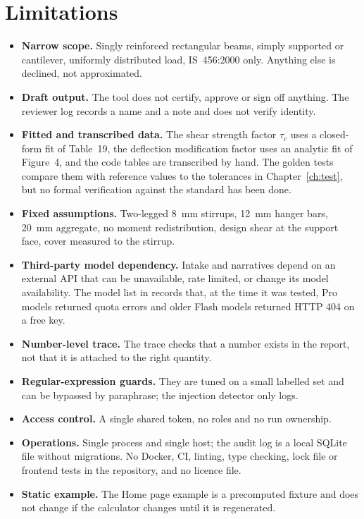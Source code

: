 \chapter{Limitations}\label{ch:limits}

\begin{itemize}
  \item \textbf{Narrow scope.} Singly reinforced rectangular beams, simply supported or cantilever, uniformly distributed load, IS~456:2000 only. Anything else is declined, not approximated.
  \item \textbf{Draft output.} The tool does not certify, approve or sign off anything. The reviewer log records a name and a note and does not verify identity.
  \item \textbf{Fitted and transcribed data.} The shear strength factor $\tau_c$ uses a closed-form fit of Table~19, the deflection modification factor uses an analytic fit of Figure~4, and the code tables are transcribed by hand. The golden tests compare them with reference values to the tolerances in Chapter~\ref{ch:test}, but no formal verification against the standard has been done.
  \item \textbf{Fixed assumptions.} Two-legged 8~mm stirrups, 12~mm hanger bars, 20~mm aggregate, no moment redistribution, design shear at the support face, cover measured to the stirrup.
  \item \textbf{Third-party model dependency.} Intake and narratives depend on an external API that can be unavailable, rate limited, or change its model availability. The model list in  records that, at the time it was tested, Pro models returned quota errors and older Flash models returned HTTP 404 on a free key.
  \item \textbf{Number-level trace.} The trace checks that a number exists in the report, not that it is attached to the right quantity.
  \item \textbf{Regular-expression guards.} They are tuned on a small labelled set and can be bypassed by paraphrase; the injection detector only logs.
  \item \textbf{Access control.} A single shared token, no roles and no run ownership.
  \item \textbf{Operations.} Single process and single host; the audit log is a local SQLite file without migrations. No Docker, CI, linting, type checking, lock file or frontend tests in the repository, and no licence file.
  \item \textbf{Static example.} The Home page example is a precomputed fixture and does not change if the calculator changes until it is regenerated.
\end{itemize}
